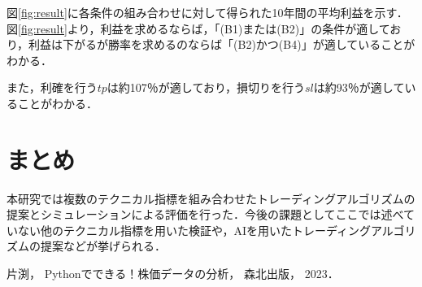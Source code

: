 \documentclass[dvipdfmx,a4paper,twocolumn,10pt]{jarticle}
\begin{document}
 図\ref{fig:result}に各条件の組み合わせに対して得られた10年間の平均利益を示す．図\ref{fig:result}より，利益を求めるならば，「(B1)または(B2)」の条件が適しており，利益は下がるが勝率を求めるのならば「(B2)かつ(B4)」が適していることがわかる．

また，利確を行う$tp$は約107％が適しており，損切りを行う$sl$は約93％が適していることがわかる．
\section{まとめ}
本研究では複数のテクニカル指標を組み合わせたトレーディングアルゴリズムの提案とシミュレーションによる評価を行った．今後の課題としてここでは述べていない他のテクニカル指標を用いた検証や，AIを用いたトレーディングアルゴリズムの提案などが挙げられる．
\begin{thebibliography}{99}\small

 {
片渕， {Pythonでできる！株価データの分析}， 森北出版， 2023．}

\end{thebibliography}
\end{document}
